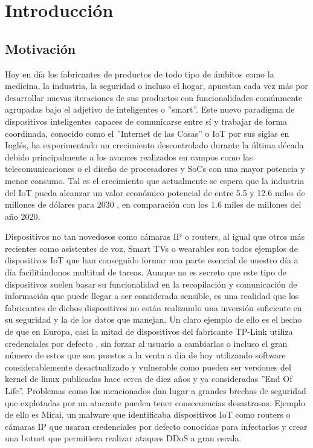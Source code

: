 \chapter{Introducción}
\label{introduccion}

\section{Motivación}
Hoy en día los fabricantes de productos de todo tipo de
ámbitos como la medicina, la industria, la seguridad o incluso el hogar, apuestan cada vez 
más por desarrollar nuevas iteraciones de sus productos con funcionalidades comúnmente agrupadas bajo el 
adjetivo de inteligentes o ''smart''. Este nuevo paradigma de dispositivos inteligentes capaces de 
comunicarse entre sí y trabajar de forma coordinada, conocido como el ''Internet de las Cosas'' o IoT por 
sus siglas en Inglés, ha experimentado un crecimiento descontrolado durante la última década debido 
principalmente a los avances realizados en campos como las telecomunicaciones o el diseño de procesadores y
SoCs con una mayor potencia y menor consumo. Tal es el crecimiento que actualmente se espera que la industria del
IoT pueda alcanzar un valor económico potencial de entre 5.5 y 12.6 miles de millones de dólares para
2030 \cite{McKinsey}, en comparación con los 1.6 miles de millones del año 2020.\bigskip

Dispositivos no tan novedosos como cámaras IP o routers, al igual que otros más 
recientes como asistentes de voz, Smart TVs o wearables son todos ejemplos 
de dispositivos IoT que han conseguido formar una parte esencial de nuestro día a día facilitándonos
multitud de tareas. Aunque no es secreto que este tipo de dispositivos suelen basar su funcionalidad en 
la recopilación y comunicación de información que puede llegar a ser considerada sensible, es una realidad 
que los fabricantes de dichos dispositivos no están realizando una inversión suficiente en su seguridad y 
la de los datos que manejan. Un claro ejemplo de ello es el hecho de que en Europa, casi la mitad 
de dispositivos del fabricante TP-Link utiliza credenciales por defecto \cite{Deepak}, sin forzar al usuario 
a cambiarlas o incluso el gran número de estos que son puestos a la venta a día de hoy utilizando software 
considerablemente desactualizado y vulnerable como pueden ser versiones del kernel de linux publicadas hace cerca de 
diez años y ya consideradas ''End Of Life''. Problemas como los mencionados dan lugar a grandes brechas de
seguridad que explotadas por un atacante pueden tener consecuencias desastrosas. Ejemplo de ello es 
Mirai\cite{mirai}, un malware que identificaba dispositivos IoT como routers o cámaras IP que usaran credenciales 
por defecto conocidas para infectarlos y crear una botnet que permitiera realizar ataques DDoS a gran escala.\bigskip


